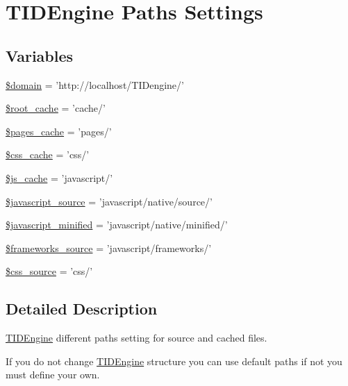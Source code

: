 \hypertarget{group__paths__settings}{
\section{TIDEngine Paths Settings}
\label{group__paths__settings}
}
\subsection*{Variables}
\begin{DoxyCompactItemize}
\item 
\hyperlink{group__paths__settings_gaef9cf198312d2f89238a8e8e2f0f67f3}{\$domain} = 'http://localhost/TIDengine/'
\item 
\hyperlink{group__paths__settings_gae39d9273ea31335b789e7d9a65ddd5e5}{\$root\_\-cache} = 'cache/'
\item 
\hyperlink{group__paths__settings_ga63fb01efe0d6e48b4ec22d087e8146fb}{\$pages\_\-cache} = 'pages/'
\item 
\hyperlink{group__paths__settings_ga0e80adb33d63c6d68ba4c65404df2f94}{\$css\_\-cache} = 'css/'
\item 
\hyperlink{group__paths__settings_ga16d37062fd28b17ccfbbc08ce3e0b776}{\$js\_\-cache} = 'javascript/'
\item 
\hyperlink{group__paths__settings_ga2f10132b94f95d29119dbfc721ec89f5}{\$javascript\_\-source} = 'javascript/native/source/'
\item 
\hyperlink{group__paths__settings_gaf110565a1dfb60e0e30898d5087688be}{\$javascript\_\-minified} = 'javascript/native/minified/'
\item 
\hyperlink{group__paths__settings_ga35ab8cb7ae69ec347b63dda82a173005}{\$frameworks\_\-source} = 'javascript/frameworks/'
\item 
\hyperlink{group__paths__settings_ga117298df65ff2026617e125d21463b93}{\$css\_\-source} = 'css/'
\end{DoxyCompactItemize}


\subsection{Detailed Description}
\hyperlink{class_t_i_d_engine}{TIDEngine} different paths setting for source and cached files.

If you do not change \hyperlink{class_t_i_d_engine}{TIDEngine} structure you can use default paths if not you must define your own. 

